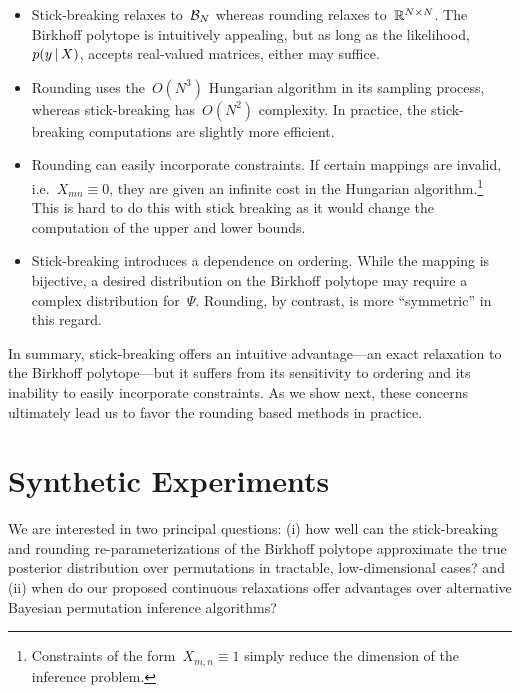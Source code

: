 \documentclass[twoside]{article}
\begin{document}
\begin{itemize}
\item Stick-breaking relaxes to~$\mathcal{B}_N$ whereas rounding relaxes
  to~$\mathbb{R}^{N \times N}$. The Birkhoff polytope is
  intuitively appealing, but as long as the likelihood,~$p(y \, | \, X)$,
  accepts real-valued matrices, either may suffice. 
  
\item Rounding uses the~$O(N^3)$ Hungarian algorithm in its sampling
  process, whereas stick-breaking has~$O(N^2)$ complexity. In practice,
  the stick-breaking computations are slightly more efficient.
    
\item Rounding can easily incorporate constraints.  If certain
  mappings are invalid, i.e.~${X_{mn} \equiv 0}$, they are given an
  infinite cost in the Hungarian algorithm.\footnote{Constraints of
    the form~$X_{m,n} \equiv 1$ simply reduce the dimension of the
    inference problem.}  This is hard to do this with stick breaking
  as it would change the computation of the upper and lower bounds. 
  
\item Stick-breaking introduces a dependence on ordering.  While the
  mapping is bijective, a desired distribution on the Birkhoff polytope
  may require a complex distribution for~$\Psi$.  Rounding, by contrast,
  is more ``symmetric'' in this regard.
  
\end{itemize}

In summary, stick-breaking offers an intuitive advantage---an exact
relaxation to the Birkhoff polytope---but it suffers from its
sensitivity to ordering and its inability to easily incorporate
constraints.  As we show next, these concerns ultimately lead us to
favor the rounding based methods in practice.

\section{Synthetic Experiments}
\label{sec:synthetic}
We are interested in two principal questions: 
 (i) how well can the stick-breaking and rounding re-parameterizations
of the Birkhoff polytope approximate the true posterior distribution
over permutations in tractable, low-dimensional cases? and (ii)
when do our proposed continuous relaxations offer
advantages over alternative  Bayesian permutation
inference algorithms?

\end{document}
